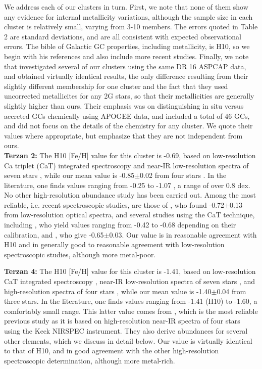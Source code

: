 \documentclass[onecolumn]{aa}
\begin{document}
We address each of our clusters in turn. First, we note that
none of them show any evidence for internal metallicity variations, although the sample size in each cluster is relatively small, varying from 3-10 members. The errors quoted in Table 2 are standard deviations, and are all consistent with expected observational errors.
The bible of Galactic GC properties, including metallicity, is H10, so we begin with his references and also include more recent studies. Finally, we note that \citet{Horta2020} investigated several of our clusters using the same DR 16 ASPCAP data, and obtained virtually identical results, the only difference resulting from their slightly different membership for one cluster and the fact that they used uncorrected metallicites for any 2G stars, so that their metallicities are generally slightly higher than ours. Their emphasis was on distinguishing in situ versus accreted GCs chemically using APOGEE data, and included a total of 46 GCs, and did not focus on the details of the chemistry for any cluster. We quote their values where appropriate, but emphasize that they are not independent from ours. \\

{\bf Terzan 2:} 
The H10 [Fe/H] value for this cluster is -0.69, based on low-resolution Ca triplet (CaT) integrated spectroscopy \citep{Armandroff1988} and near-IR low-resolution spectra of seven stars \citep{Stephens2004},
while our mean value is -0.85$\pm$0.02 from four stars \citep[][derive a slightly higher value of -0.82]{Horta2020}. In the literature, one finds values ranging from -0.25 \citep{Kuchinski1995} to -1.07 \citep{Stephens2004}, a range of over 0.8 dex. No other high-resolution abundance study has been carried out. Among the most reliable, i.e. recent spectroscopic studies, are those of  \citet{Dias2016}, who found -0.72$\pm$0.13 from low-resolution optical spectra, and several studies using the CaT technique, including \citet{Vasquez2018}, who yield values ranging from -0.42 to -0.68 depending on their calibration, and \citet{Geisler2021}, who give -0.65$\pm$0.03.
Our value is in reasonable agreement with H10 and 
in generally good to reasonable agreement with low-resolution spectroscopic studies, although more metal-poor. 

{\bf Terzan 4:}
The H10 [Fe/H] value for this cluster is -1.41, based on low-resolution CaT integrated spectroscopy \citep{Armandroff1988},  near-IR low-resolution spectra of seven stars \citep{Stephens2004}, and high-resolution spectra of four stars \citep{Origlia2004}, while our mean value is -1.40$\pm$0.04 from three stars. In the literature, one finds values ranging from -1.41 (H10) to -1.60, a comfortably small range. This latter value comes from \citet{Origlia2004}, which is the most reliable previous study as it is based on high-resolution near-IR spectra of four stars using the Keck NIRSPEC instrument. They also derive abundances for several other elements, which we discuss in detail below.
Our value is virtually identical to that of H10, and in good agreement
with the other high-resolution spectroscopic determination, although more metal-rich.
\end{document}
